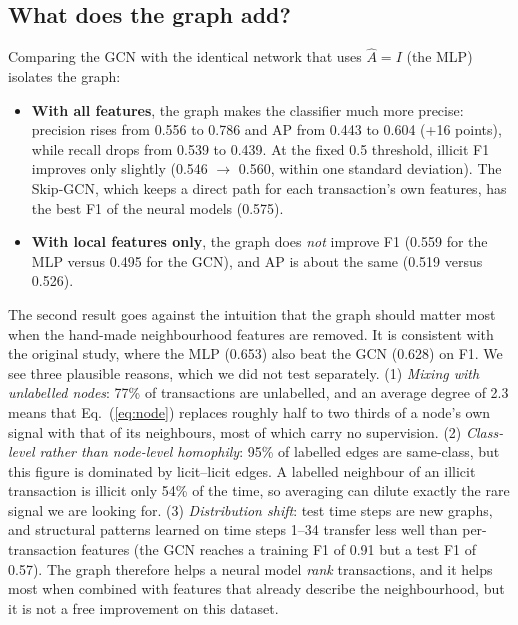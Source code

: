 \documentclass[11pt,a4paper]{article}
\newcommand{\Ahat}{\hat{A}}
\begin{document}
\subsection{What does the graph add?}
Comparing the GCN with the identical network that uses $\Ahat = I$ (the MLP) isolates the graph:
\begin{itemize}
  \item \textbf{With all features}, the graph makes the classifier much more precise: precision rises from 0.556 to 0.786 and AP from
        0.443 to 0.604 (+16 points), while recall drops from 0.539 to 0.439. At the fixed 0.5 threshold, illicit F1 improves only
        slightly (0.546 $\to$ 0.560, within one standard deviation). The Skip-GCN, which keeps a direct path for each transaction's own
        features, has the best F1 of the neural models (0.575).
  \item \textbf{With local features only}, the graph does \emph{not} improve F1 (0.559 for the MLP versus 0.495 for the GCN), and
        AP is about the same (0.519 versus 0.526).
\end{itemize}
The second result goes against the intuition that the graph should matter most when the hand-made neighbourhood features are removed.
It is consistent with the original study, where the MLP (0.653) also beat the GCN (0.628) on F1. We see three plausible reasons, which
we did not test separately.
(1) \emph{Mixing with unlabelled nodes}: 77\% of transactions are unlabelled, and an average degree of 2.3 means that
Eq.~(\ref{eq:node}) replaces roughly half to two thirds of a node's own signal with that of its neighbours, most of which carry no
supervision.
(2) \emph{Class-level rather than node-level homophily}: 95\% of labelled edges are same-class, but this figure is dominated by
licit--licit edges. A labelled neighbour of an illicit transaction is illicit only 54\% of the time, so averaging can dilute exactly
the rare signal we are looking for.
(3) \emph{Distribution shift}: test time steps are new graphs, and structural patterns learned on time steps 1--34 transfer less
well than per-transaction features (the GCN reaches a training F1 of 0.91 but a test F1 of 0.57).
The graph therefore helps a neural model \emph{rank} transactions, and it helps most when combined with features that already
describe the neighbourhood, but it is not a free improvement on this dataset.
\end{document}
